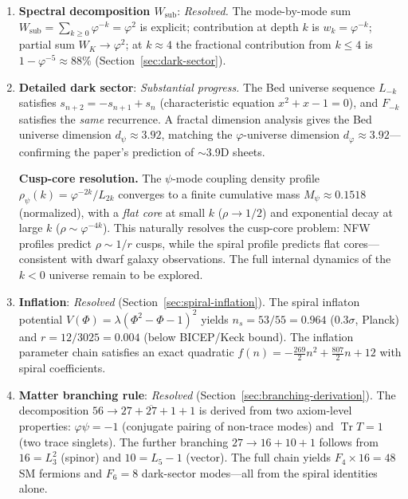 \documentclass[12pt,a4paper]{article}
\newcommand{\bed}{Bed universe}
\begin{document}
\begin{enumerate}
\item \textbf{Spectral decomposition $W_{\mathrm{sub}}$}: \emph{Resolved.} The mode-by-mode sum $W_{\mathrm{sub}} = \sum_{k\ge 0}\varphi^{-k} = \varphi^2$ is explicit; contribution at depth $k$ is $w_k = \varphi^{-k}$; partial sum $W_K \to \varphi^2$; at $k \approx 4$ the fractional contribution from $k \leq 4$ is $1 - \varphi^{-5} \approx 88\%$ (Section~\ref{sec:dark-sector}).

\item \textbf{Detailed dark sector}: \emph{Substantial progress.} The \bed{} sequence $L_{-k}$ satisfies $s_{n+2} = -s_{n+1} + s_n$ (characteristic equation $x^2 + x - 1 = 0$), and $F_{-k}$ satisfies the \emph{same} recurrence. A fractal dimension analysis gives the \bed{} dimension $d_{\psi} \approx 3.92$, matching the $\varphi$-universe dimension $d_{\varphi} \approx 3.92$---confirming the paper's prediction of $\sim$3.9D sheets.

\textbf{Cusp-core resolution.} The $\psi$-mode coupling density profile $\rho_{\psi}(k) = \varphi^{-2k}/L_{2k}$ converges to a finite cumulative mass $M_{\psi} \approx 0.1518$ (normalized), with a \emph{flat core} at small $k$ ($\rho \to 1/2$) and exponential decay at large $k$ ($\rho \sim \varphi^{-4k}$). This naturally resolves the cusp-core problem: NFW profiles predict $\rho \sim 1/r$ cusps, while the spiral profile predicts flat cores---consistent with dwarf galaxy observations. The full internal dynamics of the $k < 0$ universe remain to be explored.

\item \textbf{Inflation}: \emph{Resolved} (Section~\ref{sec:spiral-inflation}). The spiral inflaton potential $V(\Phi) = \lambda(\Phi^2 - \Phi - 1)^2$ yields $n_s = 53/55 = 0.964$ ($0.3\sigma$, Planck) and $r = 12/3025 = 0.004$ (below BICEP/Keck bound). The inflation parameter chain satisfies an exact quadratic $f(n) = -\tfrac{269}{2}n^2 + \tfrac{807}{2}n + 12$ with spiral coefficients.

\item \textbf{Matter branching rule}: \emph{Resolved} (Section~\ref{sec:branching-derivation}). The decomposition $56 \to 27 + \overline{27} + 1 + 1$ is derived from two axiom-level properties: $\varphi\psi = -1$ (conjugate pairing of non-trace modes) and $\operatorname{Tr} T = 1$ (two trace singlets). The further branching $27 \to 16 + 10 + 1$ follows from $16 = L_3^2$ (spinor) and $10 = L_5 - 1$ (vector). The full chain yields $F_4 \times 16 = 48$ SM fermions and $F_6 = 8$ dark-sector modes---all from the spiral identities alone.


\end{enumerate}
\end{document}
